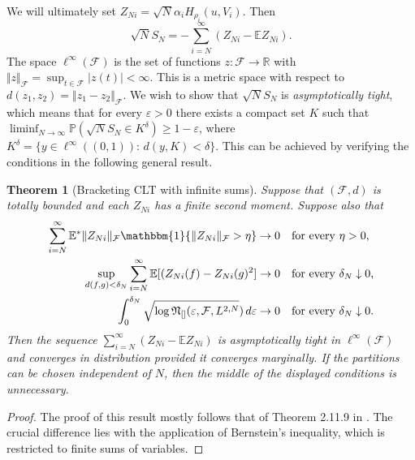 \documentclass[11pt,a4paper]{article}
\newtheorem{thm}{Theorem}
\newcommand{\R}{\mathbb{R}}
\newcommand{\E}{\mathbb{E}}
\begin{document}
\begin{appendices}
We will ultimately set $Z_{Ni} =  \sqrt{N}\alpha_{i}H_{\rho_{i}}(u,V_{i})$. Then
    \begin{equation*}
        \sqrt{N}S_{N} = -\sum_{i=N}^{\infty} (Z_{Ni} - \E Z_{Ni}).
    \end{equation*}
    The space $\ell^{\infty}(\mathcal{F})$ is the set of functions $z: \mathcal{F} \rightarrow \R$ with
$\Vert z\Vert_{\mathcal{F}} = \sup_{t \in \mathcal{F}} |z(t)| < \infty$.
This is a metric space with respect to $d(z_{1},z_{2}) = \Vert z_{1}-z_{2}\Vert_{\mathcal{F}}$. 
We wish to show that $\sqrt{N}S_{N}$ is \textit{asymptotically tight}, which means that for every $\varepsilon > 0$ there exists a compact set $K$ such that $\liminf_{N \rightarrow \infty} \mathbb{P}(\sqrt{N}S_{N} \in K^{\delta}) \geq 1-\varepsilon$,
where $K^{\delta} = \{y \in \ell^{\infty}((0,1)):\,d(y,K) < \delta\}$. This can be achieved by verifying the conditions in the following general result.

\begin{thm}[Bracketing CLT with infinite sums] \label{th::bracketing_clt}
    Suppose that $(\mathcal{F},d)$ is totally bounded and each $Z_{Ni}$ has a finite second moment. Suppose also that
    \begin{align*}
        \sum_{i=N}^{\infty} \E^{*}\Vert Z_{Ni}\Vert_{\mathcal{F}}\mathbbm{1}\{\Vert Z_{Ni}\Vert_{\mathcal{F}} > \eta \} &\rightarrow 0 \quad \text{for every $\eta > 0$,} \\
        \sup_{d(f,g) < \delta_{N}} \sum_{i=N}^{\infty} \E[(Z_{Ni}(f)-Z_{Ni}(g)^{2}] &\rightarrow 0\quad \text{for every $\delta_{N} \downarrow 0$,} \\ 
        \int_{0}^{\delta_{N}} \sqrt{\log \mathfrak{N}_{[]}(\varepsilon,\mathcal{F}, L^{2,N}})\,d\varepsilon &\rightarrow 0\quad \text{for every $\delta_{N} \downarrow 0$.} 
    \end{align*}
    Then the sequence $\sum_{i=N}^{\infty}(Z_{Ni}-\E Z_{Ni})$ is asymptotically tight in $\ell^{\infty}(\mathcal{F})$ and converges in distribution provided it converges marginally. If the partitions can be chosen independent of $N$, then the middle of the displayed conditions is unnecessary.
\end{thm}
\begin{proof}
    The proof of this result mostly follows that of Theorem 2.11.9 in \cite{vanderVaart2023}. The crucial difference lies with the application of Bernstein's inequality, which is restricted to finite sums of variables.


\end{proof}
\end{appendices}
\end{document}
